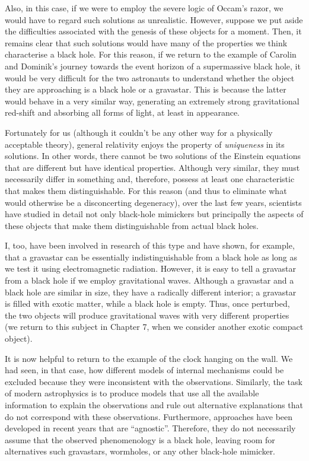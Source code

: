 Also, in this case, if we were to employ the severe logic of Occam's razor, we would
have to regard such solutions as unrealistic. However, suppose we put aside the
difficulties associated with the genesis of these objects for a moment. Then, it remains
clear that such solutions would have many of the properties we think characterise a
black hole. For this reason, if we return to the example of Carolin and Dominik's
journey towards the event horizon of a supermassive black hole, it would be very
difficult for the two astronauts to understand whether the object they are approaching
is a black hole or a gravastar. This is because the latter would behave in a very
similar way, generating an extremely strong gravitational red-shift and absorbing all
forms of light, at least in appearance.

Fortunately for us (although it couldn't be any other way for a physically acceptable
theory), general relativity enjoys the property of \emph{uniqueness}
in its solutions. In other words, there cannot be two solutions of the Einstein
equations that are different but have identical properties. Although very similar, they
must necessarily differ in something and, therefore, possess at least one characteristic
that makes them distinguishable. For this reason (and thus to eliminate what would
otherwise be a disconcerting degeneracy), over the last few years,
scientists have studied in detail not only black-hole mimickers but principally the
aspects of these objects that make them distinguishable from actual black holes.

I, too, have been involved in research of this type and have shown, for example, that a
gravastar can be essentially indistinguishable from a black hole as
long as we test it using electromagnetic radiation. However, it is easy to tell a
gravastar from a black hole if we employ gravitational waves. Although
a gravastar and a black hole are similar in size, they have a radically different
interior; a gravastar is filled with exotic matter, while a black hole
is empty. Thus, once perturbed, the two objects will produce gravitational waves with
very different properties (we return to this subject in Chapter 7, when we consider
another exotic compact object).

It is now helpful to return to the example of the clock hanging on the wall. We had
seen, in that case, how different models of internal mechanisms could be excluded
because they were inconsistent with the observations. Similarly, the task of modern
astrophysics is to produce models that use all the available information to explain the
observations and rule out alternative explanations that do not correspond with these
observations. Furthermore, approaches have been developed in recent years that are
``agnostic''. Therefore, they do not necessarily assume that the observed phenomenology
is a black hole, leaving room for alternatives such gravastars, wormholes, or any other
black-hole mimicker.

